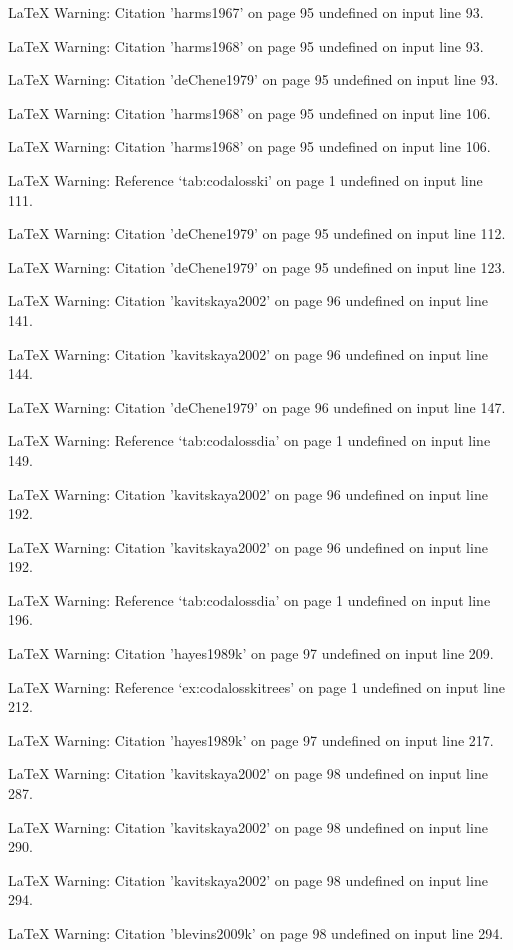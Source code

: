 LaTeX Warning: Citation 'harms1967' on page 95 undefined on input line 93.


LaTeX Warning: Citation 'harms1968' on page 95 undefined on input line 93.


LaTeX Warning: Citation 'deChene1979' on page 95 undefined on input line 93.


LaTeX Warning: Citation 'harms1968' on page 95 undefined on input line 106.


LaTeX Warning: Citation 'harms1968' on page 95 undefined on input line 106.


LaTeX Warning: Reference `tab:codalosski' on page 1 undefined on input line 111.


LaTeX Warning: Citation 'deChene1979' on page 95 undefined on input line 112.


LaTeX Warning: Citation 'deChene1979' on page 95 undefined on input line 123.


LaTeX Warning: Citation 'kavitskaya2002' on page 96 undefined on input line 141.


LaTeX Warning: Citation 'kavitskaya2002' on page 96 undefined on input line 144.


LaTeX Warning: Citation 'deChene1979' on page 96 undefined on input line 147.


LaTeX Warning: Reference `tab:codalossdia' on page 1 undefined on input line 149.


LaTeX Warning: Citation 'kavitskaya2002' on page 96 undefined on input line 192.


LaTeX Warning: Citation 'kavitskaya2002' on page 96 undefined on input line 192.


LaTeX Warning: Reference `tab:codalossdia' on page 1 undefined on input line 196.


LaTeX Warning: Citation 'hayes1989k' on page 97 undefined on input line 209.


LaTeX Warning: Reference `ex:codalosskitrees' on page 1 undefined on input line 212.


LaTeX Warning: Citation 'hayes1989k' on page 97 undefined on input line 217.


LaTeX Warning: Citation 'kavitskaya2002' on page 98 undefined on input line 287.


LaTeX Warning: Citation 'kavitskaya2002' on page 98 undefined on input line 290.


LaTeX Warning: Citation 'kavitskaya2002' on page 98 undefined on input line 294.


LaTeX Warning: Citation 'blevins2009k' on page 98 undefined on input line 294.


